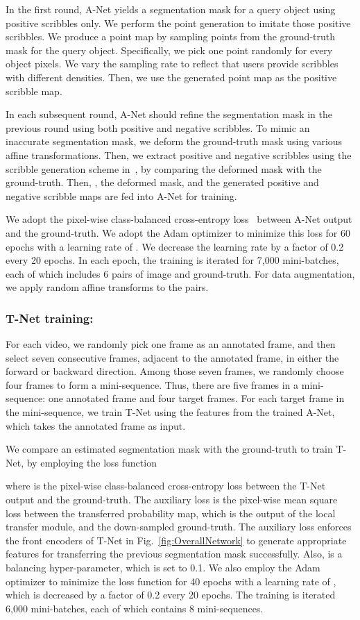 \documentclass[runningheads]{llncs}
\begin{document}
In the first round, A-Net yields a segmentation mask for a query object using positive scribbles only. We perform the point generation to imitate those positive scribbles. We produce a point map by sampling points from the ground-truth mask for the query object. Specifically, we pick one point randomly for every  object pixels. We vary the sampling rate to reflect that users provide scribbles with different densities. Then, we use the generated point map as the positive scribble map.

In each subsequent round, A-Net should refine the segmentation mask in the previous round using both positive and negative scribbles. To mimic an inaccurate segmentation mask, we deform the ground-truth mask using various affine transformations. Then, we extract positive and negative scribbles using the scribble generation scheme in~\cite{DAVISchallenge2018}, by comparing the deformed mask with the ground-truth. Then, , the deformed mask, and the generated positive and negative scribble maps are fed into A-Net for training.

We adopt the pixel-wise class-balanced cross-entropy loss~\cite{xie2015holistically} between A-Net output and the ground-truth. We adopt the Adam optimizer to minimize this loss for 60 epochs with a learning rate of . We decrease the learning rate by a factor of 0.2 every 20 epochs. In each epoch, the training is iterated for 7,000 mini-batches, each of which includes 6 pairs of image and ground-truth. For data augmentation, we apply random affine transforms to the pairs.

\subsubsection{T-Net training:}
For each video, we randomly pick one frame as an annotated frame, and then select seven consecutive frames, adjacent to the annotated frame, in either the forward or backward direction. Among those seven frames, we randomly choose four frames to form a mini-sequence. Thus, there are five frames in a mini-sequence: one annotated frame and four target frames. For each target frame
in the mini-sequence, we train T-Net using the features from the trained A-Net, which takes the annotated frame as input.

We compare an estimated segmentation mask with the ground-truth to train T-Net, by employing the loss function

where  is the pixel-wise class-balanced cross-entropy loss between the T-Net output and the ground-truth. The auxiliary loss  is the pixel-wise mean square loss between the transferred probability map, which is the output of the local transfer module, and the down-sampled ground-truth. The auxiliary loss  enforces the front encoders of T-Net in Fig.~\ref{fig:OverallNetwork} to generate appropriate features for transferring the previous segmentation mask successfully. Also,  is a balancing hyper-parameter, which is set to 0.1. We also employ the Adam optimizer to minimize the loss function for 40 epochs with a learning rate of , which is decreased by a factor of 0.2 every 20 epochs. The training is iterated 6,000 mini-batches, each of which contains 8 mini-sequences.
\end{document}

